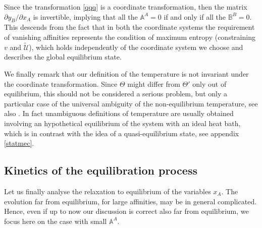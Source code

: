 \documentclass[useAMS,usenatbib,prd,twocolumn,nofootinbib]{revtex4-1}
\begin{document}
Since the transformation \eqref{qqq} is a coordinate transformation, then the matrix 
$
\partial y_B/\partial x_A
$
is invertible, implying that all the $\mathbb{A}^A=0$ if and only if all the $\mathbb{B}^B=0$. 
This descends from the fact that in both the coordinate systems the requirement of vanishing affinities represents the condition of maximum entropy (constraining $v$ and $\tilde{\mathcal{U}}$), which holds independently of the coordinate system we choose and describes the global equilibrium state.


We finally remark  that our definition of the temperature is not invariant under the coordinate transformation. Since $\Theta$ might differ from $\Theta'$ only out of equilibrium, this should not be considered a serious problem, but only a particular case of the universal ambiguity of the non-equilibrium temperature, see also \cite{JouNonEqTemp2003}. In fact unambiguous definitions of temperature are usually obtained involving an hypothetical equilibrium of the system with an ideal heat bath, which is in contrast with the idea of a quasi-equilibrium state, see appendix \ref{statmec}.

\subsection{Kinetics of the equilibration process}\label{kinetics}

Let us finally analyse the relaxation to equilibrium of the variables $x_A$. The evolution far from equilibrium, for large affinities, may be in general complicated. Hence, even if up to now our discussion is correct also far from equilibrium,  we focus here  on the case with small $\mathbb{A}^A$.
\end{document}

